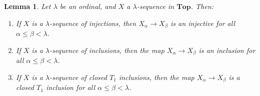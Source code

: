 \documentclass{amsart}
\theoremstyle{plain}
\newtheorem{lemma}[theorem]{Lemma}
\theoremstyle{definition}
\newcommand{\Top}{\mbf{Top}}
\newcommand{\0}{\mathbf{0}}
\newcommand{\mbf}[1]{\mathbf{#1}}
\renewcommand{\(}{\left(}
\renewcommand{\)}{\right)}
\begin{document}
\begin{lemma}\label{lambda_sequence_of_inclusions_makes_everything_an_inclusion}
  Let $\lambda$ be an ordinal, and $X$ a $\lambda$-sequence in $\Top$. 
  Then:
  \begin{enumerate}[label=(\roman*)]
    \item If $X$ is a $\lambda$-sequence of injections, then $X_\alpha\to X_\beta$ is an injective for all $\alpha\leq\beta<\lambda$.
    \item If $X$ is a $\lambda$-sequence of inclusions, then the map $X_\alpha\to X_\beta$ is an inclusion for all $\alpha\leq\beta<\lambda$.
    \item If $X$ is a $\lambda$-sequence of closed $T_1$ inclusions, then the map $X_\alpha\to X_\beta$ is a closed $T_1$ inclusion for all $\alpha\leq\beta<\lambda$.
  \end{enumerate}
\end{lemma}
\end{document}
